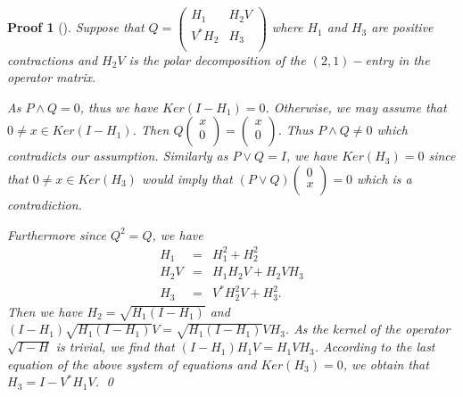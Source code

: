\documentclass{jaums}
\theoremstyle{thmit} %
\theoremstyle{thmrm} %
\newtheorem*{oldproof}{Proof}
\renewenvironment{proof}[1][{}]{\begin{oldproof}[#1]}{\qed\end{oldproof}}
\begin{document}
\begin{proof} Suppose that $Q=\left(
                                                           \begin{array}{cc}
                                                             H_1 & H_2V \\
                                                             V^*H_2 & H_3 \\
                                                           \end{array}
                                                         \right)$ where $H_1$
and $H_3$ are positive contractions and $H_2V$ is
                                                         the polar decomposition
of the $(2,1)-$entry in the operator matrix.

As $P\wedge Q=0$, thus we have $Ker(I-H_1)=0$. Otherwise, we may assume that
$0\neq x\in Ker(I-H_1)$. Then 
$Q\left(
\begin{array}{c}
                                                                                
                        x \\
                                                                                
                        0 \\
                                                                                
                      \end{array}                                              
                    \right)
=\left(
   \begin{array}{c}
     x \\
     0 \\
   \end{array}
 \right)
$. Thus $P\wedge Q\neq0$ which contradicts our assumption. Similarly as $P\vee
Q=I$, we have $Ker(H_3)=0$ since that $0\neq x\in Ker(H_3)$ would imply that
$(P\vee Q)\left(
\begin{array}{c}
0 \\
x \\
\end{array}
\right)=0$
which is a contradiction.

Furthermore since $Q^2=Q$, we have
\begin{eqnarray*}
  H_1 &=& H_1^2+H_2^2  \\
  H_2V &=& H_1H_2V+H_2VH_3  \\
  H_3 &=& V^*H_2^2V+H_3^2.
\end{eqnarray*}
Then we have $H_2=\sqrt{H_1(I-H_1)}$ and
$(I-H_1)\sqrt{H_1(I-H_1)}V=\sqrt{H_1(I-H_1)}VH_3$. As the kernel of the operator
$\sqrt{I-H}$ is trivial,
we find that $(I-H_1)H_1V=H_1VH_3$. According to the last equation of the
above system of equations and $Ker(H_3)=0$, we obtain that $H_3=I-V^*H_1V$.
\end{proof}
\end{document}
